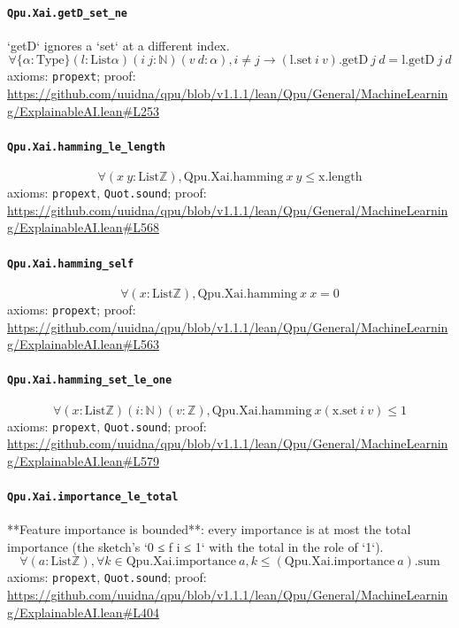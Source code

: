 \documentclass[11pt]{article}
\begin{document}
\paragraph{\texttt{Qpu.Xai.getD\_set\_ne}}
`getD` ignores a `set` at a different index.
\[ \forall \{\alpha : \mathrm{Type}\} (l : \mathrm{List} \alpha ) (i\ j : \mathbb{N}) (v\ d : \alpha ), i \ne j \to (\mathrm{l.set}\ i\ v)\mathrm{.getD}\ j\ d = \mathrm{l.getD}\ j\ d \]
\noindent axioms: \texttt{propext}; proof: \url{https://github.com/uuidna/qpu/blob/v1.1.1/lean/Qpu/General/MachineLearning/ExplainableAI.lean\#L253}

\paragraph{\texttt{Qpu.Xai.hamming\_le\_length}}
\[ \forall (x\ y : \mathrm{List} \mathbb{Z}), \mathrm{Qpu.Xai.hamming}\ x\ y \le \mathrm{x.length} \]
\noindent axioms: \texttt{propext}, \texttt{Quot.sound}; proof: \url{https://github.com/uuidna/qpu/blob/v1.1.1/lean/Qpu/General/MachineLearning/ExplainableAI.lean\#L568}

\paragraph{\texttt{Qpu.Xai.hamming\_self}}
\[ \forall (x : \mathrm{List} \mathbb{Z}), \mathrm{Qpu.Xai.hamming}\ x\ x = 0 \]
\noindent axioms: \texttt{propext}; proof: \url{https://github.com/uuidna/qpu/blob/v1.1.1/lean/Qpu/General/MachineLearning/ExplainableAI.lean\#L563}

\paragraph{\texttt{Qpu.Xai.hamming\_set\_le\_one}}
\[ \forall (x : \mathrm{List} \mathbb{Z}) (i : \mathbb{N}) (v : \mathbb{Z}), \mathrm{Qpu.Xai.hamming}\ x (\mathrm{x.set}\ i\ v) \le 1 \]
\noindent axioms: \texttt{propext}, \texttt{Quot.sound}; proof: \url{https://github.com/uuidna/qpu/blob/v1.1.1/lean/Qpu/General/MachineLearning/ExplainableAI.lean\#L579}

\paragraph{\texttt{Qpu.Xai.importance\_le\_total}}
**Feature importance is bounded**: every importance is at most the total importance (the sketch's `0 ≤ f i ≤ 1` with the total in the role of `1`).
\[ \forall (a : \mathrm{List} \mathbb{Z}), \forall k \in \mathrm{Qpu.Xai.importance}\ a, k \le (\mathrm{Qpu.Xai.importance}\ a)\mathrm{.sum} \]
\noindent axioms: \texttt{propext}, \texttt{Quot.sound}; proof: \url{https://github.com/uuidna/qpu/blob/v1.1.1/lean/Qpu/General/MachineLearning/ExplainableAI.lean\#L404}
\end{document}
